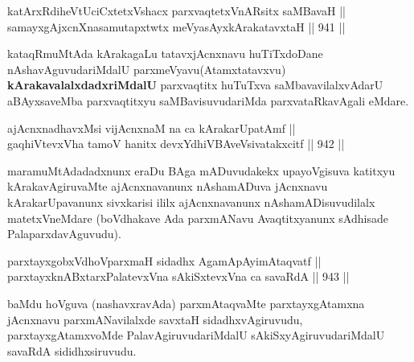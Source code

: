 \begin{shl}
katArxRdiheVtUciCxtetxVshacx parxvaqtetxVnARsitx saMBavaH || \\
samayxgAjxcnXnasamutapxtwtx meVyasAyxkArakatavxtaH ||  941 ||  
\end{shl}

\begin{artha}
kataqRmuMtAda kArakagaLu tatavxjAcnxnavu huTiTxdoDane nAshavAguvudariMdalU parxmeVyavu(Atamxtatavxvu) \textbf{kArakavalalxdadxriMdalU} parxvaqtitx huTuTxva saMbavavilalxvAdarU aBAyxsaveMba parxvaqtitxyu saMBavisuvudariMda parxvataRkavAgali eMdare.
\end{artha}

\begin{shl}
ajAcnxnadhavxMsi vijAcnxnaM na ca kArakarUpatAmf || \\
gaqhiVtevxVha tamoV hanitx devxYdhiVBAveV\s sivatakxcitf ||  942 ||  
\end{shl}

\begin{artha}
maramuMtAdadadxnunx eraDu BAga mADuvudakekx upayoVgisuva katitxyu kArakavAgiruvaMte ajAcnxnavanunx nAshamADuva jAcnxnavu kArakarUpavanunx sivxkarisi ililx ajAcnxnavanunx nAshamADisuvudilalx matetxVneMdare (boVdhakave Ada parxmANavu Avaqtitxyanunx sAdhisade PalaparxdavAguvudu).
\end{artha}

\begin{shl}
\footnotemark[1]parxtayxgobxVdhoV\s parxmaH sidadhx AgamApAyimAtaqvatf || \\
parxtayxknABxtarxPalatevxVna sAkiSxtevxVna ca savaRdA ||  943 ||  
\end{shl}

\begin{artha}
baMdu hoVguva (nashavxravAda) parxmAtaqvaMte parxtayxgAtamxna jAcnxnavu parxmANavilalxde savxtaH sidadhxvAgiruvudu, parxtayxgAtamxvoMde PalavAgiruvudariMdalU sAkiSxyAgiruvudariMdalU savaRdA sididhxsiruvudu.
\end{artha}



